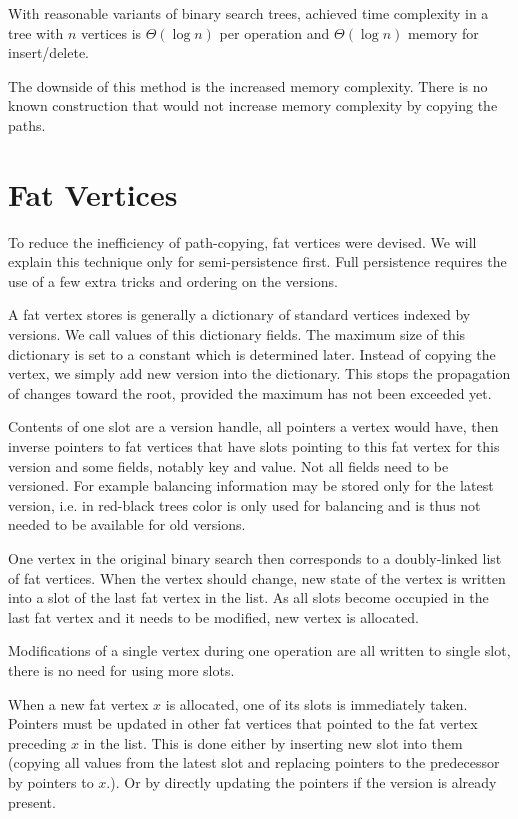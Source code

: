 With reasonable variants of binary search trees, achieved time complexity in a tree with $n$ vertices is $\Theta(\log n)$ per operation and $\Theta(\log n)$ memory for insert/delete.

The downside of this method is the increased memory complexity. There is no known construction that would not increase memory complexity by copying the paths.

\section{Fat Vertices}

To reduce the inefficiency of path-copying, fat vertices were devised. We will explain this technique only for semi-persistence first. Full persistence requires the use of a few extra tricks and ordering on the versions.

A fat vertex stores is generally a dictionary of standard vertices indexed by versions. We call values of this dictionary fields. The maximum size of this dictionary is set to a constant which is determined later. Instead of copying the vertex, we simply add new version into the dictionary. This stops the propagation of changes toward the root, provided the maximum has not been exceeded yet.

Contents of one slot are a version handle, all pointers a vertex would have, then inverse pointers to fat vertices that have slots pointing to this fat vertex for this version and 
some fields, notably key and value. Not all fields need to be versioned. For example balancing information may be stored only for the latest version, i.e. in red-black trees color is only used for balancing and is thus not needed to be available for old versions. 

One vertex in the original binary search then corresponds to a doubly-linked list of fat vertices. When the vertex should change, new state of the vertex is written into a slot of the last fat vertex in the list. As all slots become occupied in the last fat vertex and it needs to be modified, new vertex is allocated.

Modifications of a single vertex during one operation are all written to single slot, there is no need for using more slots.

When a new fat vertex $x$ is allocated, one of its slots is immediately taken. Pointers must be updated in other fat vertices that pointed to the fat vertex preceding $x$ in the list. This is done either by inserting new slot into them (copying all values from the latest slot and replacing pointers to the predecessor by pointers to $x$.). Or by directly updating the pointers if the version is already present. 

